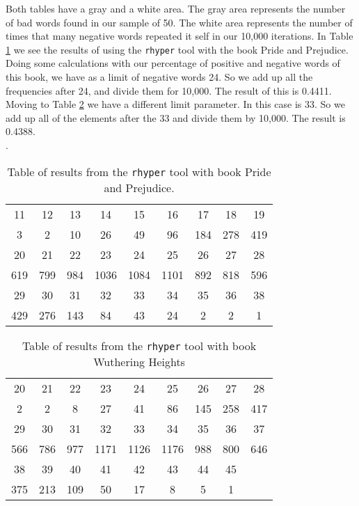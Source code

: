 \documentclass{article}
\begin{document}
Both tables have a gray and a white area. The gray area represents the number of bad words found in our sample of 50. The white area represents the number of times that many negative words repeated it self in our 10,000 iterations. In Table \ref{table2} we see the results of using the \texttt{rhyper} tool with the book Pride and Prejudice. Doing some calculations with our percentage of positive and negative words of this book, we have as a limit of negative words 24. So we add up all the frequencies after 24, and divide them for 10,000. The result of this is 0.4411. \\

Moving to Table \ref{table1} we have a different limit parameter. In this case is 33. So we add up all of the elements after the 33 and divide them by 10,000. The result is 0.4388.\\
.
\begin{table}\caption{Table of results from the \texttt{rhyper} tool with book Pride and Prejudice.}
\begin{center}\label{table2}
\begin{tabular}{ | c | c | c | c | c | c | c | c | c |}
\hline
\rowcolor{Gray}
11	&	12	&	13	&	14	&	15	&	16	&	17	&	18	&	19	\\
3	&	2	&	10	&	26	&	49	&	96	&	184	&	278	&	419	\\
\hline
\hline
\rowcolor{Gray}
20	&	21	&	22	&	23	&	24	&	25	&	26	&	27	&	28	\\
619	&	799	&	984	&	1036	&	1084	&	1101	&	892	&	818	&	596	\\
\hline
\hline
\rowcolor{Gray}
29	&	30	&	31	&	32	&	33	&	34	&	35	&	36	&	38	\\
429	&	276	&	143	&	84	&	43	&	24	&	2	&	2	&	1	\\
\hline
\end{tabular}
\end{center}
\end{table}


\begin{table}\caption{Table of results from the \texttt{rhyper} tool with book Wuthering Heights}
\begin{center}\label{table1}
\begin{tabular}{ | c | c | c | c | c | c | c | c | c |}
\hline
\rowcolor{Gray}
20	&	21	&	22	&	23	&	24	&	25	&	26	&	27	&	28	\\
2	&	2	&	8	&	27	&	41	&	86	&	145	&	258	&	417	\\
\hline
\hline
\rowcolor{Gray}
29	&	30	&	31	&	32	&	33	&	34	&	35	&	36	&	37	\\
566	&	786	&	977	&	1171	&	1126	&	1176	&	988	&	800	&	646	\\
\hline
\hline
\rowcolor{Gray}
38	&	39	&	40	&	41	&	42	&	43	&	44	&	45	&\cellcolor{white}		\\
375	&	213	&	109	&	50	&	17	&	8	&	5	&	1	&		\\
\hline
\end{tabular}
\end{center}
\end{table}
\end{document}

